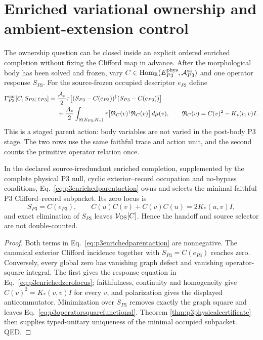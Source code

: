 \section{Enriched variational ownership and ambient-extension control}
\label{app:p3ownership}

The ownership question can be closed inside an explicit ordered enriched
completion without fixing the Clifford map in advance.  After the
morphological body has been solved and frozen, vary
$C\in\operatorname{Hom}_{\mathbb R}(E_{P3}^{\rm phys},
\mathcal A_{P3}^{\rm sa})$ and one operator response $S_{P3}$.  For the
source-frozen occupied descriptor $e_{P3}$ define
\begin{align}
 \Gamma_{P3}^{\rm enr}[C,S_{P3};e_{P3}]
 ={}&{\mathcal A_*\over2}\tau\!\left[
 (S_{P3}-C(e_{P3}))^\dagger(S_{P3}-C(e_{P3}))\right]
 \nonumber\\
 &+{\mathcal A_*\over2}\int_{S(E_{P3},K_*)}
 \tau\!\left[\mathfrak R_C(v)^\dagger\mathfrak R_C(v)\right]d\mu(v),
 \qquad
 \mathfrak R_C(v)=C(v)^2-K_*(v,v)I.
 \label{eq:p3enrichedparentaction}
\end{align}
This is a staged parent action: body variables are not varied in the
post-body P3 stage.  The two rows use the same faithful trace and action unit,
and the second counts the primitive operator relation once.

\begin{theorem}
\label{thm:p3enrichedownership}
In the declared source-irredundant enriched completion, supplemented by the
complete physical P3 null, cyclic exterior--record occupation and no-bypass
conditions, Eq.~\eqref{eq:p3enrichedparentaction} owns and selects the minimal
faithful P3 Clifford--record subpacket.  Its zero locus is
\begin{equation}
 S_{P3}=C(e_{P3}),
 \qquad
 C(u)C(v)+C(v)C(u)=2K_*(u,v)I,
 \label{eq:p3enrichedzerolocus}
\end{equation}
and exact elimination of $S_{P3}$ leaves
$\mathcal V_{\rm OS}[C]$.  Hence the handoff and source selector are not
double-counted.
\end{theorem}

\begin{proof}
Both terms in Eq.~\eqref{eq:p3enrichedparentaction} are nonnegative.  The
canonical exterior Clifford incidence together with
$S_{P3}=C(e_{P3})$ reaches zero.  Conversely, every global zero has vanishing
graph defect and vanishing operator-square integral.  The first gives the
response equation in Eq.~\eqref{eq:p3enrichedzerolocus}; faithfulness,
continuity and homogeneity give
$C(v)^2=K_*(v,v)I$ for every $v$, and polarization gives the displayed
anticommutator.  Minimization over $S_{P3}$ removes exactly the graph square
and leaves Eq.~\eqref{eq:p3operatorsquarefunctional}.  Theorem
\ref{thm:p3physicalcertificate} then supplies typed-unitary uniqueness of the
minimal occupied subpacket. QED.
\end{proof}

